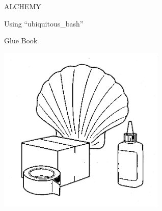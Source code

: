 \begin{titlepage}
\centering
{\Huge ALCHEMY}\par\vspace{1em}
{\LARGE Using ``ubiquitous\_bash''}\par\vspace{1em}
{\Large Glue Book}\par\vspace{2em}
\includegraphics[width=0.6\textwidth]{_lib/ALCHEMY/00-titlePage/mascott-ChatGPT_o3-small.png}
\end{titlepage}